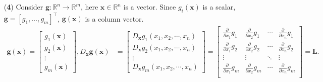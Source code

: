 \documentclass[12pt,thmsa]{article}
\begin{document}
\begin{itemize}
	\item[({\bf{4}})] Consider \(\boldsymbol{g}: \mathbb{R}^{n} \rightarrow \mathbb{R}^m \),  here \( \boldsymbol{x} \in  \mathbb{R}^n \) is a vector. Since \(g_{i}(\boldsymbol{x})\) is a scalar, \(\boldsymbol{g}=\left[g_1, \ldots, g_m\right]^{\top} \), \(\boldsymbol{g}(\boldsymbol{x})\) is a column vector.
	\[
	\begin{aligned}
		\boldsymbol{g} \left( \boldsymbol{x} \right)=
		\left[
		\begin{array}{c}
			g_{1}( \boldsymbol{x} ) \\
			g_{2}( \boldsymbol{x} ) \\
			\vdots \\
			g_{m}( \boldsymbol{x} )
		\end{array}
		\right], 
		D_{\boldsymbol{x}} \boldsymbol{g}\left( \boldsymbol{x} \right) & =\left[
		\begin{aligned}
			D_{\boldsymbol{x}} g_{1}\left( x_1,x_2,\cdots,x_n \right) \\
			D_{\boldsymbol{x}} g_{2}\left( x_1,x_2,\cdots,x_n \right) \\
			\vdots \qquad \qquad \\
			D_{\boldsymbol{x}} g_{m}\left( x_1,x_2,\cdots,x_n \right)
		\end{aligned}
		\right]
		= \left[
		\begin{array}{cccc}
			\frac{\partial}{\partial x_1} g_1
			& \frac{\partial}{\partial x_2} g_1
			& \cdots 
			& \frac{\partial}{\partial x_n} g_1 \\
			\frac{\partial}{\partial x_1} g_2
			& \frac{\partial}{\partial x_2} g_2
			& \cdots 
			& \frac{\partial}{\partial x_n} g_2 \\
			\vdots & \vdots & \ddots & \vdots \\
			\frac{\partial}{\partial x_1} g_m
			& \frac{\partial}{\partial x_2} g_m
			& \cdots 
			& \frac{\partial}{\partial x_n} g_m \\
		\end{array}
		\right] = \boldsymbol{L}. \\

\end{aligned}\]
\end{itemize}
\end{document}
